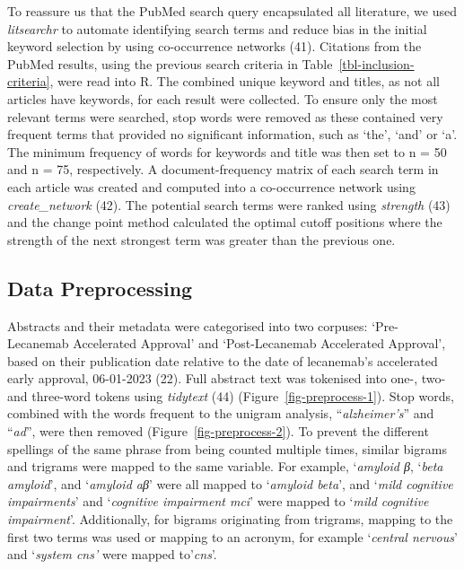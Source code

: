 \documentclass[
  a4paper,
]{article}
\begin{document}
To reassure us that the PubMed search query encapsulated all literature,
we used \emph{litsearchr} to automate identifying search terms and
reduce bias in the initial keyword selection by using co-occurrence
networks (41). Citations from the PubMed results, using the previous
search criteria in Table~\ref{tbl-inclusion-criteria}, were read into R.
The combined unique keyword and titles, as not all articles have
keywords, for each result were collected. To ensure only the most
relevant terms were searched, stop words were removed as these contained
very frequent terms that provided no significant information, such as
`the', `and' or `a'. The minimum frequency of words for keywords and
title was then set to n = 50 and n = 75, respectively. A
document-frequency matrix of each search term in each article was
created and computed into a co-occurrence network using
\emph{create\_network} (42). The potential search terms were ranked
using \emph{strength} (43) and the change point method calculated the
optimal cutoff positions where the strength of the next strongest term
was greater than the previous one.

\hypertarget{data-preprocessing}{%
\subsection{Data Preprocessing}\label{data-preprocessing}}

Abstracts and their metadata were categorised into two corpuses:
`Pre-Lecanemab Accelerated Approval' and `Post-Lecanemab Accelerated
Approval', based on their publication date relative to the date of
lecanemab's accelerated early approval, 06-01-2023 (22). Full abstract
text was tokenised into one-, two- and three-word tokens using
\emph{tidytext} (44) (Figure~\ref{fig-preprocess-1}). Stop words,
combined with the words frequent to the unigram analysis,
``\emph{alzheimer's}'' and ``\emph{ad}'', were then removed
(Figure~\ref{fig-preprocess-2}). To prevent the different spellings of
the same phrase from being counted multiple times, similar bigrams and
trigrams were mapped to the same variable. For example, `\emph{amyloid
β}, `\emph{beta amyloid}', and `\emph{amyloid aβ}' were all mapped to
`\emph{amyloid beta}', and `\emph{mild cognitive impairments}' and
`\emph{cognitive impairment mci}' were mapped to `\emph{mild cognitive
impairment}'. Additionally, for bigrams originating from trigrams,
mapping to the first two terms was used or mapping to an acronym, for
example `\emph{central nervous}' and `\emph{system cns'} were mapped
to'\emph{cns}'.
\end{document}
